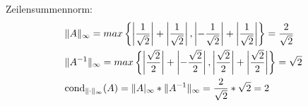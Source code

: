 Zeilensummennorm:
\begin{align*}
\begin{split}
&\|A\|_\infty =max\left\lbrace\left|\frac{1}{\sqrt2}\right|+\left|\frac{1}{\sqrt2}\right|, \left|-\frac{1}{\sqrt2}\right|+\left|\frac{1}{\sqrt2}\right|\right\rbrace=\frac{2}{\sqrt2}\\
&\|A^{-1}\|_\infty=max\left\lbrace\left|\frac{\sqrt2}{2}\right|+\left|-\frac{\sqrt2}{2}\right|, \left|\frac{\sqrt2}{2}\right|+\left|\frac{\sqrt2}{2}\right|\right\rbrace={\sqrt2}\\
& \mathrm{cond}_{\| \cdot \|_\infty}(A)=\|A|_\infty*\|A^{-1}\|_\infty=\frac{2}{\sqrt2} * {\sqrt2} = 2\\
\end{split}
\end{align*}
\newline


